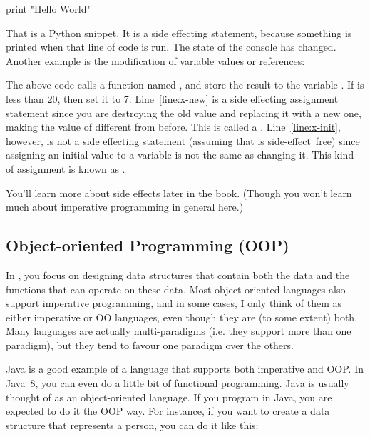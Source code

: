 \begin{Python}
print "Hello World"
\end{Python}

That is a Python snippet. It is a side effecting statement, because something is printed when that line of code is run. The state of the console has changed. Another example is the modification of variable values or references: 

\begin{Python}
x = function_that_returns_int() (*@\label{line:x-init}@*)
if x < 20:
	x = 7 (*@{\label{line:x-new}@*)
\end{Python}

The above code calls a function named , and store the result to the variable . If  is less than 20, then set it to 7. Line~\ref{line:x-new} is a side effecting assignment statement since you are destroying the old value and replacing it with a new one, making the value of  different from before. This is called a . Line~\ref{line:x-init}, however, is not a side effecting statement (assuming that  is side-effect~free) since assigning an initial value to a variable is not the same as changing it. This kind of assignment is known as .

You'll learn more about side effects later in the book. (Though you won't learn much about imperative programming in general here.)

\subsection{Object-oriented Programming (OOP)}
In , you focus on designing data structures that contain both the data and the functions that can operate on these data. Most object-oriented languages also support imperative programming, and in some cases, I only think of them as either imperative  or OO languages, even though they are (to some extent) both. Many languages are actually multi-paradigms (i.e. they support more than one paradigm), but they tend to favour one paradigm over the others. 

Java is a good example of a language that supports both imperative and OOP. In Java~8, you can even do a little bit of functional programming. Java is usually thought of as an object-oriented language. If you program in Java, you are expected to do it the OOP way. For instance, if you want to create a data structure that represents a person, you can do it like this:

